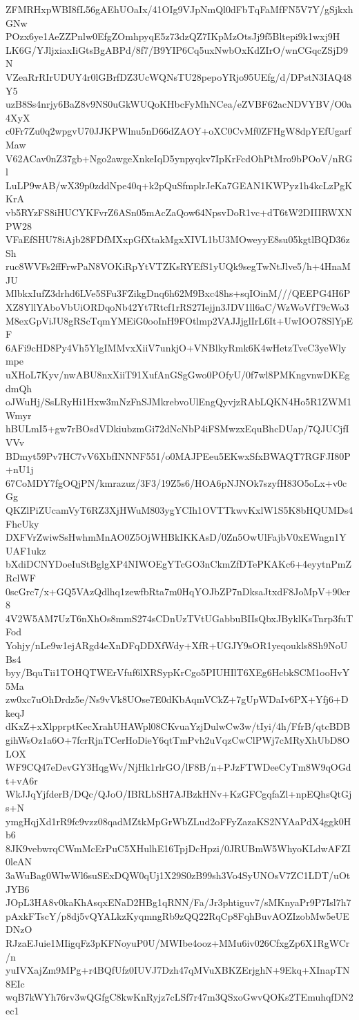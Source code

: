 ZFMRHxpWBI8fL56gAEhUOaIx/41OIg9VJpNmQl0dFbTqFaMfFN5V7Y/gSjkxhGNw
POzx6ye1AeZZPnlw0EfgZOmhpyqE5z73dzQZ7IKpMzOtsJj9f5Bltepi9k1wxj9H
LK6G/YJljxiaxIiGtsBgABPd/8f7/B9YIP6Cq5uxNwbOxKdZIrO/wnCGqcZSjD9N
VZeaRrRIrUDUY4r0lGBrfDZ3UcWQNsTU28pepoYRjo95UEfg/d/DPstN3IAQ48Y5
uzB8Ss4nrjy6BaZ8v9NS0uGkWUQoKHbcFyMhNCea/eZVBF62acNDVYBV/O0a4XyX
c0Fr7Zu0q2wpgvU70JJKPWlnu5nD66dZAOY+oXC0CvMf0ZFHgW8dpYEfUgarfMaw
V62ACav0nZ37gb+Ngo2awgeXnkeIqD5ynpyqkv7IpKrFcdOhPtMro9bPOoV/nRGl
LuLP9wAB/wX39p0zddNpe40q+k2pQuSfmplrJeKa7GEAN1KWPyz1h4kcLzPgKKrA
vb5RYzFS8iHUCYKFvrZ6ASn05mAcZaQow64NpsvDoR1vc+dT6tW2DIIIRWXNPW28
VFaEfSHU78iAjb28FDfMXxpGfXtakMgxXIVL1bU3MOweyyE8su05kgtlBQD36zSh
ruc8WVFs2ffFrwPaN8VOKiRpYtVTZKsRYEfS1yUQk9segTwNtJlve5/h+4HnaMJU
MlbkxIufZ3drhd6LVe5SFu3FZikgDnq6h62M9Bxc48hs+sqIOinM///QEEPG4H6P
XZ8YllYAboVbUiORDqoNb42Yt7Rtcf1rRS27Iejjn3JDV1ll6aC/WzWoVfT9cWo3
M8exGpViJU8gRScTqmYMEiG0ooInH9FOtlmp2VAJJjglIrL6It+UwIOO78SlYpEF
6AFi9cHD8Py4Vh5YlgIMMvxXiiV7unkjO+VNBlkyRmk6K4wHetzTveC3yeWlympe
uXHoL7Kyv/nwABU8nxXiiT91XufAnGSgGwo0POfyU/0f7wl8PMKngvnwDKEgdmQh
oJWuHj/SsLRyHi1Hxw3mNzFnSJMkrebvoUlEngQyvjzRAbLQKN4Ho5R1ZWM1Wmyr
hBULmI5+gw7rBOsdVDkiubzmGi72dNcNbP4iFSMwzxEquBhcDUap/7QJUCjfIVVv
BDmyt59Pv7HC7vV6XbfINNNF551/o0MAJPEeu5EKwxSfxBWAQT7RGFJI80P+nU1j
67CoMDY7fgOQjPN/kmrazuz/3F3/19Z5s6/HOA6pNJNOk7szyfH83O5oLx+v0cGg
QKZlPiZUcamVyT6RZ3XjHWuM803ygYCIh1OVTTkwvKxlW1S5K8bHQUMDs4FhcUky
DXFVrZwiwSsHwhmMnAO0Z5OjWHBkIKKAsD/0Zn5OwUlFajbV0xEWngn1YUAF1ukz
bXdiDCNYDoeIuStBglgXP4NIWOEgYTcGO3nCkmZfDTePKAKc6+4eyytnPmZRclWF
0scGrc7/x+GQ5VAzQdlhq1zewfbRta7m0HqYOJbZP7nDksaJtxdF8JoMpV+90cr8
4V2W5AM7UzT6nXhOs8mmS274sCDnUzTVtUGabbuBIIsQbxJByklKsTnrp3fuTFod
Yohjy/nLe9w1ejARgd4eXnDFqDDXfWdy+XfR+UGJY9sOR1yeqoukls8Sh9NoUBs4
byy/BquTii1TOHQTWErVfuf6lXRSypKrCgo5PIUHIlT6XEg6HcbkSCM1ooHvY5Ma
zw0xc7uOhDrdz5e/Ns9vVk8UOse7E0dKbAqmVCkZ+7gUpWDaIv6PX+Yfj6+DkeqJ
dKxZ+xXlpprptKecXrahUHAWpl08CKvuaYzjDulwCw3w/tIyi/4h/FfrB/qtcBDB
gihWsOz1a6O+7fcrRjnTCerHoDieY6qtTmPvh2uVqzCwClPWj7cMRyXhUbD8OLOX
WF9CQ47eDevGY3HqgWv/NjHk1rlrGO/lF8B/n+PJzFTWDeeCyTm8W9qOGdt+vA6r
WkJJqYjfderB/DQc/QJoO/IBRLbSH7AJBzkHNv+KzGFCgqfaZl+npEQhsQtGjs+N
ymgHqjXd1rR9fc9vzz08qadMZtkMpGrWbZLud2oFFyZazaKS2NYAaPdX4ggk0Hb6
8JK9vebwrqCWmMcErPuC5XHulhE16TpjDcHpzi/0JRUBmW5WhyoKLdwAFZI0leAN
3aWuBag0WlwWl6suSExDQW0qUj1X29S0zB99sh3Vo4SyUNOsV7ZC1LDT/uOtJYB6
JOpL3HA8v0kaKhAsqxENaD2HBg1qRNN/Fa/Jr3phtiguv7/sMKnyaPr9P7Isl7h7
pAxkFTscY/p8dj5vQYALkzKyqmngRb9zQQ22RqCp8FqhBuvAOZIzobMw5eUEDNzO
RJzaEJuie1MIigqFz3pKFNoyuP0U/MWIbe4ooz+MMu6iv026CfxgZp6X1RgWCr/n
yuIVXajZm9MPg+r4BQfUfz0IUVJ7Dzh47qMVuXBKZErjghN+9Ekq+XInapTN8EIc
wqB7kWYh76rv3wQGfgC8kwKnRyjz7cLSf7r47m3QSxoGwvQOKs2TEmuhqfDN2ec1
